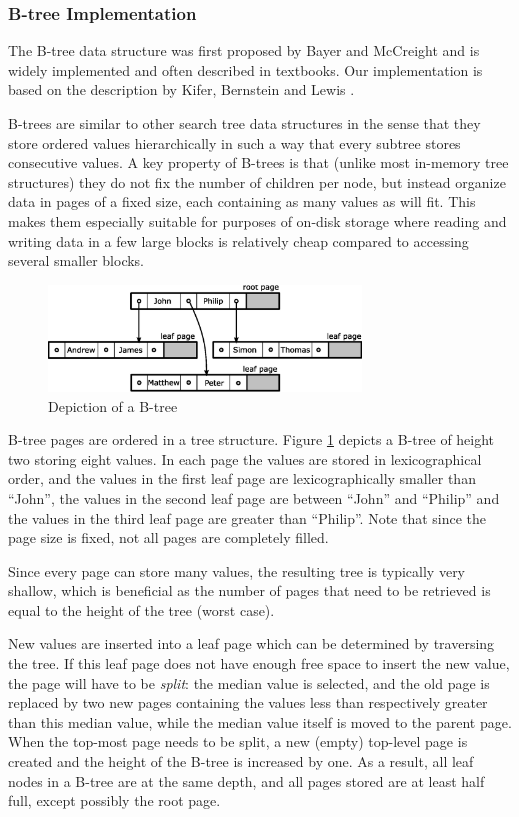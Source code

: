 \documentclass{acm_proc_article-sp}
\begin{document}
\subsubsection{B-tree Implementation}
The B-tree data structure was first proposed by Bayer and McCreight
\cite{bayer1970oam} and is widely implemented and often described in
textbooks. Our implementation is based on the description by Kifer, Bernstein
and Lewis \cite{kifer2006dsa}.

B-trees are similar to other search tree data structures in the sense that
they store ordered values hierarchically in such a way that every subtree stores
consecutive values.
A key property of B-trees is that (unlike most in-memory tree structures) they
do not fix the number of children per node, but instead organize data in pages
of a fixed size, each containing as many values as will fit.
This makes them especially suitable for purposes of on-disk storage where
reading and writing data in a few large blocks is relatively cheap compared to
accessing several smaller blocks.

\begin{figure}[b]
\centering
\includegraphics[width=83mm]{b-tree}
\caption{Depiction of a B-tree}
\label{fig-b-tree}
\end{figure}

B-tree pages are ordered in a tree structure. Figure \ref{fig-b-tree} depicts a
B-tree of height two storing eight values.
In each page the values are stored in lexicographical order, and the values
in the first leaf page are lexicographically smaller than ``John'', the values
in the second leaf page are between ``John'' and ``Philip'' and the values in
the third leaf page are greater than ``Philip''. Note that since the page
size is fixed, not all pages are completely filled.

Since every page can store many values, the resulting tree is typically very
shallow, which is beneficial as the number of pages that need to be retrieved
is equal to the height of the tree (worst case).

New values are inserted into a leaf page which can be determined by traversing
the tree.
If this leaf page does not have enough free space to insert the new value,
the page will have to be \emph{split}: the median value is selected, and the old
page is replaced by two new pages containing the values less than respectively
greater than this median value, while the median value itself is moved to the
parent page.
When the top-most page needs to be split, a new (empty) top-level page is
created and the height of the B-tree is increased by one. As a result, all leaf
nodes in a B-tree are at the same depth, and all pages stored are at least half
full, except possibly the root page.
\end{document}
